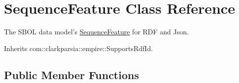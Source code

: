 \hypertarget{classorg_1_1sbolstandard_1_1lib_s_b_o_lj_1_1_sequence_feature}{
\section{SequenceFeature Class Reference}
\label{classorg_1_1sbolstandard_1_1lib_s_b_o_lj_1_1_sequence_feature}
}


The SBOL data model's \hyperlink{classorg_1_1sbolstandard_1_1lib_s_b_o_lj_1_1_sequence_feature}{SequenceFeature} for RDF and Json.  




Inherits com::clarkparsia::empire::SupportsRdfId.

\subsection*{Public Member Functions}
